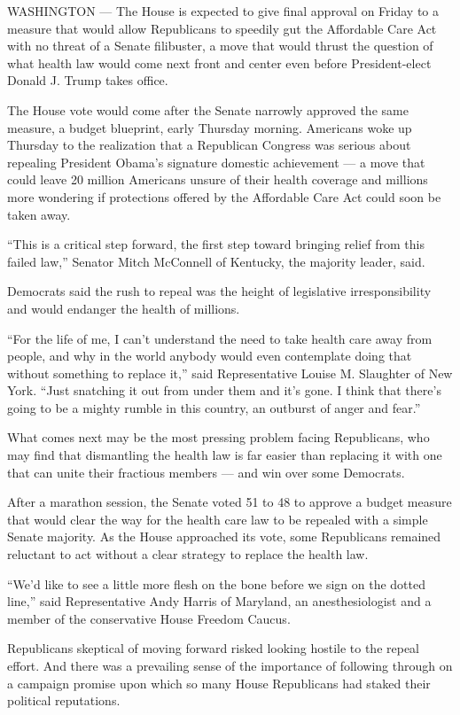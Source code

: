 WASHINGTON --- The House is expected to give final approval on Friday to
a measure that would allow Republicans to speedily gut the Affordable
Care Act with no threat of a Senate filibuster, a move that would thrust
the question of what health law would come next front and center even
before President-elect Donald J. Trump takes office.

The House vote would come after the Senate narrowly approved the same
measure, a budget blueprint, early Thursday morning. Americans woke up
Thursday to the realization that a Republican Congress was serious about
repealing President Obama's signature domestic achievement --- a move
that could leave 20 million Americans unsure of their health coverage
and millions more wondering if protections offered by the Affordable
Care Act could soon be taken away.

``This is a critical step forward, the first step toward bringing relief
from this failed law,'' Senator Mitch McConnell of Kentucky, the
majority leader, said.

Democrats said the rush to repeal was the height of legislative
irresponsibility and would endanger the health of millions.

``For the life of me, I can't understand the need to take health care
away from people, and why in the world anybody would even contemplate
doing that without something to replace it,'' said Representative Louise
M. Slaughter of New York. ``Just snatching it out from under them and
it's gone. I think that there's going to be a mighty rumble in this
country, an outburst of anger and fear.''

What comes next may be the most pressing problem facing Republicans, who
may find that dismantling the health law is far easier than replacing it
with one that can unite their fractious members --- and win over some
Democrats.

After a marathon session, the Senate voted 51 to 48 to approve a budget
measure that would clear the way for the health care law to be repealed
with a simple Senate majority. As the House approached its vote, some
Republicans remained reluctant to act without a clear strategy to
replace the health law.

``We'd like to see a little more flesh on the bone before we sign on the
dotted line,'' said Representative Andy Harris of Maryland, an
anesthesiologist and a member of the conservative House Freedom Caucus.

Republicans skeptical of moving forward risked looking hostile to the
repeal effort. And there was a prevailing sense of the importance of
following through on a campaign promise upon which so many House
Republicans had staked their political reputations.

